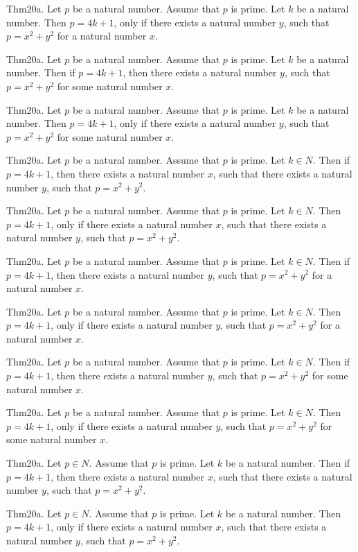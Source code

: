 \documentclass{article}
\begin{document}
Thm20a. Let $p$ be a natural number. Assume that $p$ is prime. Let $k$ be a natural number. Then $p = 4 k + 1$, only if there exists a natural number $y$, such that $p = x ^{ 2}+ y ^{ 2}$ for a natural number $x$.

Thm20a. Let $p$ be a natural number. Assume that $p$ is prime. Let $k$ be a natural number. Then if $p = 4 k + 1$, then there exists a natural number $y$, such that $p = x ^{ 2}+ y ^{ 2}$ for some natural number $x$.

Thm20a. Let $p$ be a natural number. Assume that $p$ is prime. Let $k$ be a natural number. Then $p = 4 k + 1$, only if there exists a natural number $y$, such that $p = x ^{ 2}+ y ^{ 2}$ for some natural number $x$.

Thm20a. Let $p$ be a natural number. Assume that $p$ is prime. Let $k \in N$. Then if $p = 4 k + 1$, then there exists a natural number $x$, such that there exists a natural number $y$, such that $p = x ^{ 2}+ y ^{ 2}$.

Thm20a. Let $p$ be a natural number. Assume that $p$ is prime. Let $k \in N$. Then $p = 4 k + 1$, only if there exists a natural number $x$, such that there exists a natural number $y$, such that $p = x ^{ 2}+ y ^{ 2}$.

Thm20a. Let $p$ be a natural number. Assume that $p$ is prime. Let $k \in N$. Then if $p = 4 k + 1$, then there exists a natural number $y$, such that $p = x ^{ 2}+ y ^{ 2}$ for a natural number $x$.

Thm20a. Let $p$ be a natural number. Assume that $p$ is prime. Let $k \in N$. Then $p = 4 k + 1$, only if there exists a natural number $y$, such that $p = x ^{ 2}+ y ^{ 2}$ for a natural number $x$.

Thm20a. Let $p$ be a natural number. Assume that $p$ is prime. Let $k \in N$. Then if $p = 4 k + 1$, then there exists a natural number $y$, such that $p = x ^{ 2}+ y ^{ 2}$ for some natural number $x$.

Thm20a. Let $p$ be a natural number. Assume that $p$ is prime. Let $k \in N$. Then $p = 4 k + 1$, only if there exists a natural number $y$, such that $p = x ^{ 2}+ y ^{ 2}$ for some natural number $x$.

Thm20a. Let $p \in N$. Assume that $p$ is prime. Let $k$ be a natural number. Then if $p = 4 k + 1$, then there exists a natural number $x$, such that there exists a natural number $y$, such that $p = x ^{ 2}+ y ^{ 2}$.

Thm20a. Let $p \in N$. Assume that $p$ is prime. Let $k$ be a natural number. Then $p = 4 k + 1$, only if there exists a natural number $x$, such that there exists a natural number $y$, such that $p = x ^{ 2}+ y ^{ 2}$.
\end{document}
